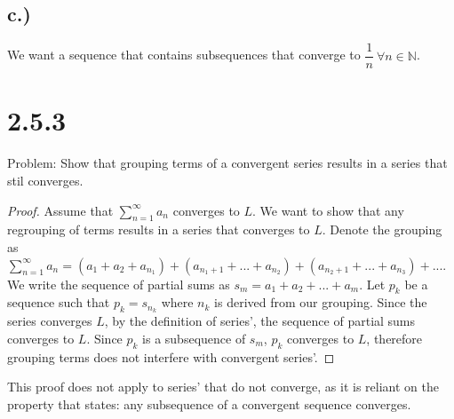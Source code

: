 \documentclass{article}
\begin{document}
	\subsection*{c.)}
		We want a sequence that contains subsequences that converge to $\dfrac{1}{n} \ \forall n \in \mathbb{N}$.
\section*{2.5.3}
	Problem: Show that grouping terms of a convergent series results in a series that stil converges.
	\begin{proof}
		Assume that $\sum_{n=1}^{\infty} a_n$ converges to $L$. We want to show that any regrouping of terms results in a series that converges to $L$. Denote the grouping as $\sum_{n=1}^{\infty}a_n = (a_1 + a_2 + a_{n_1}) + (a_{n_1+1} + ... + a_{n_2}) + (a_{n_2+1} + ... + a_{n_3}) + ...$. We write the sequence of partial sums as $s_m = a_1 + a_2 + ... + a_m$. Let $p_k$ be a sequence such that $p_k = s_{n_k}$ where $n_k$ is derived from our grouping. Since the series converges $L$, by the definition of series', the sequence of partial sums converges to $L$. Since $p_k$ is a subsequence of $s_m$, $p_k$ converges to $L$, therefore grouping terms does not interfere with convergent series'.
	\end{proof}

	This proof does not apply to series' that do not converge, as it is reliant on the property that states: any subsequence of a convergent sequence converges.
\end{document}

